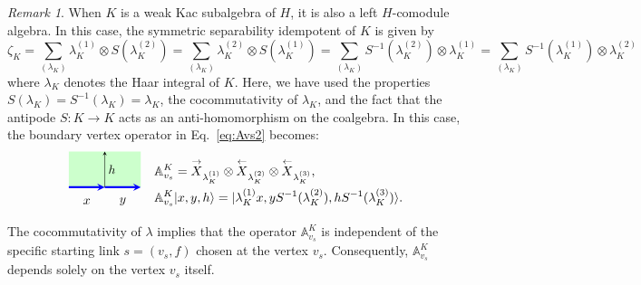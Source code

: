 \documentclass[a4paper,11pt]{article}
\theoremstyle{theorem}
\theoremstyle{remark}
\newtheorem{remark}{Remark}[section]
\newcommand{\Av}{\mathbb{A}}
\newcommand{\XR}{\overset{\rightarrow}{X}}
\newcommand{\XL}{\overset{\leftarrow}{X}}
\newcommand{\cone}{(1)}
\newcommand{\ctwo}{(2)}
\newcommand{\cthree}{(3)}
\begin{document}
\begin{remark}
When \( K \) is a weak Kac subalgebra of \( H \), it is also a left \( H \)-comodule algebra. In this case, the symmetric separability idempotent of \( K \) is given by
\[
\zeta_K = \sum_{(\lambda_K)} \lambda_K^{(1)} \otimes S(\lambda_K^{(2)}) = \sum_{(\lambda_K)} \lambda_K^{(2)} \otimes S(\lambda_K^{(1)}) = \sum_{(\lambda_K)} S^{-1}(\lambda_K^{(2)}) \otimes \lambda_K^{(1)} = \sum_{(\lambda_K)} S^{-1}(\lambda_K^{(1)}) \otimes \lambda_K^{(2)}
\]
where \( \lambda_K \) denotes the Haar integral of \( K \). Here, we have used the properties \( S(\lambda_K) = S^{-1}(\lambda_K) = \lambda_K \), the cocommutativity of \( \lambda_K \), and the fact that the antipode \( S: K \to K \) acts as an anti-homomorphism on the coalgebra.
In this case, the boundary vertex operator in Eq.~\eqref{eq:Avs2} becomes:
\begin{equation}
    \begin{aligned}
     \begin{tikzpicture}
    \begin{scope}[rotate=90] %
        \fill[green!20] (0, 0) rectangle (1,2); %
        \draw[-stealth,blue,line width = 1.6pt] (0,1) -- (0,0);
        \draw[-stealth,blue,line width = 1.6pt] (0,2) -- (0,1); 
        \draw[-stealth,black] (0,1) -- (1,1); 
       	\node[ line width=0.2pt, dashed, draw opacity=0.5] (a) at (-0.4,0.5){$y$};
    		\node[ line width=0.2pt, dashed, draw opacity=0.5] (a) at (-0.4,1.5){$x$};
            \node[ line width=0.2pt, dashed, draw opacity=0.5] (a) at (0.5,0.8){$h$};
    \end{scope}
\end{tikzpicture} \end{aligned} 
 \quad 
 \begin{aligned}
    & \Av^K_{v_s}=\XR_{\lambda_K^{\cone}}\otimes \XL_{\lambda_K^{\ctwo}}\otimes \XL_{\lambda_K^{\cthree}},\\
    & \Av^K_{v_s}|x,y,h\rangle= |\lambda_K^{\cone}x, yS^{-1}(\lambda_K^{\ctwo}), hS^{-1}(\lambda_K^{\cthree})\rangle.
 \end{aligned}
\end{equation} 
The cocommutativity of \(\lambda\) implies that the operator \(\Av^K_{v_s}\) is independent of the specific starting link \(s = (v_s, f)\) chosen at the vertex \(v_s\). Consequently, \(\Av^K_{v_s}\) depends solely on the vertex \(v_s\) itself.
\end{remark}
\end{document}
